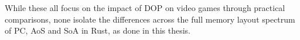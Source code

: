 While these all focus on the impact of \ac{DOP} on video games through practical comparisons, none isolate the differences across the full memory layout spectrum of \ac{PC}, \ac{AoS} and \ac{SoA} in Rust, as done in this thesis.
